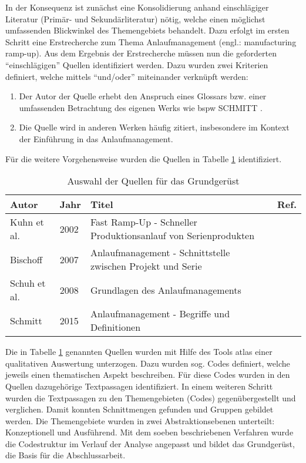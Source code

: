 In der Konsequenz ist zunächst eine Konsolidierung anhand einschlägiger Literatur (Primär- und Sekundärliteratur) nötig, welche einen möglichst umfassenden Blickwinkel des Themengebiets behandelt. Dazu erfolgt im ersten Schritt eine Erstrecherche zum Thema Anlaufmanagement (engl.: manufacturing ramp-up). Aus dem Ergebnis der Erstrecherche müssen nun die geforderten ``einschlägigen'' Quellen identifiziert werden. Dazu wurden zwei Kriterien definiert, welche mittels ``und/oder'' miteinander verknüpft werden: 
\begin{enumerate}
 \item Der Autor der Quelle erhebt den Anspruch eines Glossars bzw. einer umfassenden Betrachtung des eigenen Werks wie \gls{bspw} SCHMITT \cite{Schmitt2015}. 
 \item Die Quelle wird in anderen Werken häufig zitiert, insbesondere im Kontext der Einführung in das Anlaufmanagement. 
\end{enumerate}

Für die weitere Vorgehensweise wurden die Quellen in Tabelle \ref{tab:quellengrundgeruest} identifiziert. 
% 
\begin{table}[h]
\caption{ Auswahl der Quellen für das Grundgerüst} \label{tab:quellengrundgeruest} 
\begin{center}
\begin{tabular}{l l l r}
\textbf{Autor} & \textbf{Jahr} & \textbf{Titel} & \textbf{Ref.} \\ \hline
 Kuhn et al.  & 2002 & Fast Ramp-Up - Schneller Produktionsanlauf von Serienprodukten & \cite{Kuhn2002} \\
 Bischoff & 2007 & Anlaufmanagement - Schnittstelle zwischen Projekt und Serie & \cite{Bischoff2007} \\
 Schuh et al. & 2008 & Grundlagen des Anlaufmanagements & \cite{Schuh2008} \\
 Schmitt & 2015 & Anlaufmanagement - Begriffe und Definitionen & \cite{Schmitt2015} 
 \end{tabular} 
 \end{center}
\end{table}
% 
% 
Die in Tabelle \ref{tab:quellengrundgeruest} genannten Quellen wurden mit Hilfe des Tools \gls{atlas} 
einer qualitativen Auswertung unterzogen. Dazu wurden sog. Codes definiert, welche jeweils einen thematischen Aspekt beschreiben. Für diese Codes wurden in den Quellen dazugehörige Textpassagen identifiziert. In einem weiteren Schritt wurden die Textpassagen zu den Themengebieten (Codes) gegenübergestellt und verglichen. Damit konnten Schnittmengen gefunden und Gruppen gebildet werden. Die Themengebiete wurden in zwei Abstraktionsebenen unterteilt: Konzeptionell und Ausführend.
Mit dem soeben beschriebenen Verfahren wurde die Codestruktur im Verlauf der Analyse angepasst und bildet das Grundgerüst, die Basis für die Abschlussarbeit. 

